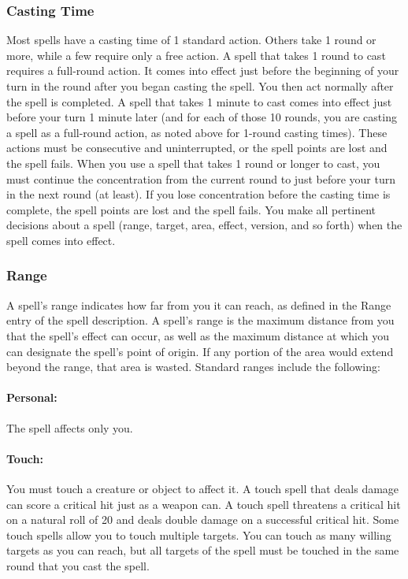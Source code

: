 \subsubsection{Casting Time}
Most spells have a casting time of 1 standard action. Others take 1 round or more, while a few require only a free action.
A spell that takes 1 round to cast requires a full-round action. 
It comes into effect just before the beginning of your turn in the round after you began casting the spell. 
You then act normally after the spell is completed. 
A spell that takes 1 minute to cast comes into effect just before your turn 1 minute later (and for each of those 10 rounds, 
you are casting a spell as a full-round action, as noted above for 1-round casting times). 
These actions must be consecutive and uninterrupted, or the spell points are lost and the spell fails.
When you use a spell that takes 1 round or longer to cast, 
you must continue the concentration from the current round to just before your turn in the next round (at least). 
If you lose concentration before the casting time is complete, the spell points are lost and the spell fails.
You make all pertinent decisions about a spell (range, target, area, effect, version, and so forth) when the spell comes into effect.

\subsubsection{Range}
A spell's range indicates how far from you it can reach, as defined in the Range entry of the spell description. 
A spell's range is the maximum distance from you that the spell's effect can occur, 
as well as the maximum distance at which you can designate the spell's point of origin. 
If any portion of the area would extend beyond the range, that area is wasted. Standard ranges include the following:

\paragraph{Personal:} The spell affects only you.

\paragraph{Touch:} You must touch a creature or object to affect it. A touch spell that deals damage can score a critical hit just as a weapon can. 
A touch spell threatens a critical hit on a natural roll of 20 and deals double damage on a successful critical hit. 
Some touch spells allow you to touch multiple targets. 
You can touch as many willing targets as you can reach, but all targets of the spell must be touched in the same round that you cast the spell.

